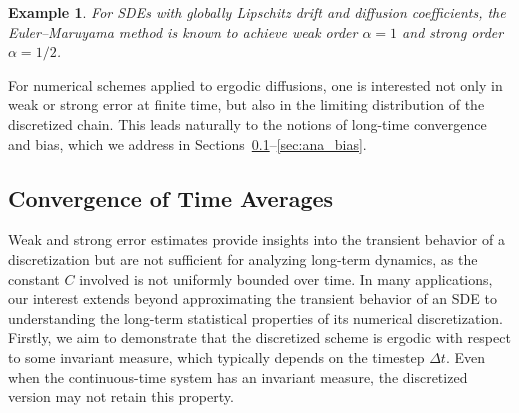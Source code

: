 \documentclass[11pt, twoside]{report}
\newtheorem{example}[theorem]{Example}
\begin{document}
\begin{example}
    For SDEs with globally Lipschitz drift and diffusion coefficients, the Euler–Maruyama method is known to achieve weak order $\alpha = 1$ and strong order $\alpha = 1/2$. 
\end{example}
For numerical schemes applied to ergodic diffusions, one is interested not only in weak or strong error at finite time, but also in the limiting distribution of the discretized chain. This leads naturally to the notions of long-time convergence and bias, which we address in Sections~\ref{sec:conv_time_avg}--\ref{sec:ana_bias}.

\subsection{Convergence of Time Averages} \label{sec:conv_time_avg}
Weak and strong error estimates provide insights into the transient behavior of a discretization but are not sufficient for analyzing long-term dynamics, as the constant $C$ involved is not uniformly bounded over time. In many applications, our interest extends beyond approximating the transient behavior of an SDE to understanding the long-term statistical properties of its numerical discretization. Firstly, we aim to demonstrate that the discretized scheme is ergodic with respect to some invariant measure, which typically depends on the timestep $\Delta t$. Even when the continuous-time system has an invariant measure, the discretized version may not retain this property.
\end{document}

